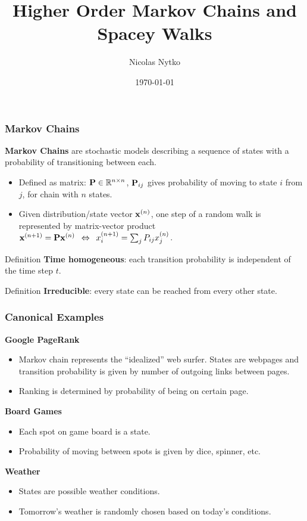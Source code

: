 \documentclass{beamer}
\title{Higher Order Markov Chains and Spacey Walks}
\author{Nicolas Nytko}
\date{\today}
\begin{document}
\frame{\titlepage}

\begin{frame}
\frametitle{Markov Chains}
{\bf Markov Chains} are stochastic models describing a sequence of states with a probability of transitioning between each.
\begin{itemize}
\item Defined as matrix: ${\bf P} \in \mathbb{R}^{n\times n}$, ${\bf P}_{ij}$ gives probability of moving to state $i$ from $j$, for chain with $n$ states.
\item Given distribution/state vector ${\bf x}^{(n)}$, one step of a random walk is represented by matrix-vector product ${\bf x}^{(n+1)} = {\bf P} {\bf x}^{(n)} \enskip \Leftrightarrow \enskip x^{(n+1)}_i = \sum_j P_{ij} x^{(n)}_j $.
\end{itemize}

\begin{block}{Definition}
{\bf Time homogeneous}: each transition probability is independent of the time step $t$.
\end{block}

\begin{block}{Definition}
{\bf Irreducible}: every state can be reached from every other state.
\end{block}

\end{frame}

\begin{frame}
\frametitle{Canonical Examples}

\textbf{Google PageRank}
\begin{itemize}
\item Markov chain represents the ``idealized'' web surfer.  States are webpages and transition probability is given by number of outgoing links between pages.
\item Ranking is determined by probability of being on certain page.
\end{itemize}

\textbf{Board Games}
\begin{itemize}
\item Each spot on game board is a state.
\item Probability of moving between spots is given by dice, spinner, etc.
\end{itemize}

\textbf{Weather}
\begin{itemize}
\item States are possible weather conditions.
\item Tomorrow's weather is randomly chosen based on today's conditions.
\end{itemize}

\end{frame}
\end{document}
